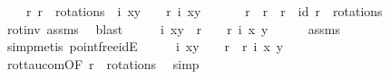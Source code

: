 \begin{isabellebody}
\ \ \ {\isachardoublequoteopen}{\isasymexists}\ r{\isacharprime}{\isacharprime}{\isachardot}\ r{\isacharprime}{\isacharprime}\ {\isasymin}\ rotations\ {\isasymand}\ i\ {\isacharparenleft}x{\isacharcomma}y{\isacharparenright}\ {\isacharequal}\ {\isacharparenleft}{\isasymtau}\ {\isasymcirc}\ r{\isacharprime}{\isacharprime}{\isacharparenright}\ {\isacharparenleft}i\ {\isacharparenleft}x{\isacharcomma}y{\isacharparenright}{\isacharparenright}{\isachardoublequoteclose}\ \isanewline
%
\isadelimproof
%
\endisadelimproof
%
\isatagproof
{}\isamarkupfalse%
\ {\isacharminus}\isanewline
\ \ \isamarkupfalse%
\ r{\isacharprime}{\isacharprime}\ \ {\isachardoublequoteopen}r{\isacharprime}{\isacharprime}\ {\isasymcirc}\ r{\isacharprime}\ {\isacharequal}\ id{\isachardoublequoteclose}\ {\isachardoublequoteopen}r{\isacharprime}{\isacharprime}\ {\isasymin}\ rotations{\isachardoublequoteclose}\ \isamarkupfalse%
\ rot{\isacharunderscore}inv\ assms{\isacharparenleft}{}{\isacharparenright}\ \isamarkupfalse%
\ blast\isanewline
\ \ \isamarkupfalse%
\ \isamarkupfalse%
\ {\isachardoublequoteopen}i\ {\isacharparenleft}x{\isacharcomma}y{\isacharparenright}\ {\isacharequal}\ {\isacharparenleft}r{\isacharprime}{\isacharprime}\ {\isasymcirc}\ {\isasymtau}\ {\isasymcirc}\ r{\isacharparenright}\ {\isacharparenleft}i\ {\isacharparenleft}x{\isacharcomma}\ y{\isacharparenright}{\isacharparenright}{\isachardoublequoteclose}\isanewline
\ \ \ \ \isamarkupfalse%
\ assms{\isacharparenleft}{}{\isacharparenright}\ \isamarkupfalse%
\ {\isacharparenleft}simp{\isacharcomma}metis\ pointfree{\isacharunderscore}idE{\isacharparenright}\isanewline
\ \ \isamarkupfalse%
\ \isamarkupfalse%
\ {\isachardoublequoteopen}i\ {\isacharparenleft}x{\isacharcomma}y{\isacharparenright}\ {\isacharequal}\ {\isacharparenleft}{\isasymtau}\ {\isasymcirc}\ r{\isacharprime}{\isacharprime}\ {\isasymcirc}\ r{\isacharparenright}\ {\isacharparenleft}i\ {\isacharparenleft}x{\isacharcomma}\ y{\isacharparenright}{\isacharparenright}{\isachardoublequoteclose}\isanewline
\ \ \ \ \isamarkupfalse%
\ rot{\isacharunderscore}tau{\isacharunderscore}com{\isacharbrackleft}OF\ {\isacartoucheopen}r{\isacharprime}{\isacharprime}\ {\isasymin}\ rotations{\isacartoucheclose}{\isacharbrackright}\ \isamarkupfalse%
\ simp\isanewline
\ \ \isamarkupfalse%
\ \isamarkupfalse%

\end{isabellebody}
